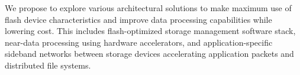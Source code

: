 We propose to explore various architectural solutions to make maximum use of
flash device characteristics and improve data processing capabilities while
lowering cost. This includes flash-optimized storage management software stack,
near-data processing using hardware accelerators, and application-specific
sideband networks between storage devices accelerating application packets and
distributed file systems.
